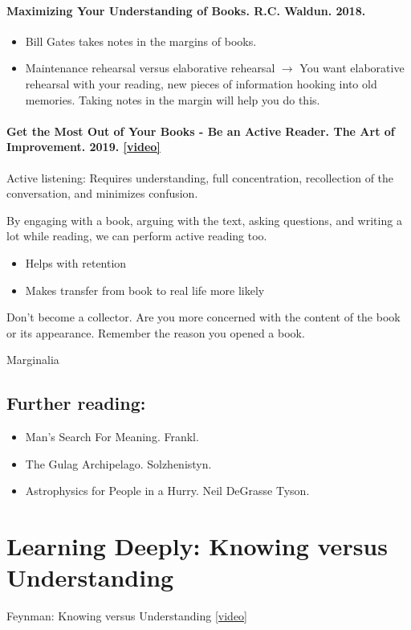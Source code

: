 \paragraph*{Maximizing Your Understanding of Books. R.C. Waldun. 2018. }
\begin{itemize}
\item  Bill Gates takes notes in the margins of books. 
\item Maintenance rehearsal versus elaborative rehearsal $\to$ You want elaborative rehearsal with your reading, new pieces of information hooking into old memories. Taking notes in the margin will help you do this. 
\end{itemize}

\paragraph*{ Get the Most Out of Your Books - Be an Active Reader. The Art of Improvement. 2019. \href{https://youtu.be/muc5dTN8_yE}{[video]} }

Active listening: Requires understanding, full concentration, recollection of the conversation, and minimizes confusion. 

By engaging with a book, arguing with the text, asking questions, and writing a lot while reading, we can perform active reading too. 
\begin{itemize}
	\item Helps with retention
	\item Makes transfer from book to real life more likely
\end{itemize}

Don't become a collector. Are you more concerned with the content of the book or its appearance. Remember the reason you opened a book. 

Marginalia




\subsection{Further reading:} 
\begin{itemize}
	\item Man's Search For Meaning. Frankl. 
	\item The Gulag Archipelago. Solzhenistyn.  
	\item Astrophysics for People in a Hurry. Neil DeGrasse Tyson. 
\end{itemize}

\section{Learning Deeply: Knowing versus Understanding}

Feynman: Knowing versus Understanding \href{https://youtu.be/NM-zWTU7X-k}{[video]}



